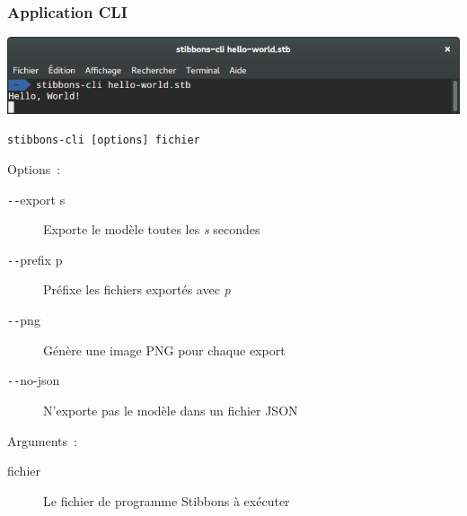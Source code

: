 \begin{frame}[fragile]
\frametitle{Application CLI}
\begin{center}
\includegraphics[scale=0.24]{doc/Presentation/screenshot/stibbons-cli.png}
\end{center}

\verb|stibbons-cli [options] fichier|

Options~:
\begin{description}
	\item[\texttt{-{}-}export s] Exporte le modèle toutes les \emph{s} secondes
	\item[\texttt{-{}-}prefix p] Préfixe les fichiers exportés avec \emph{p}
	\item[\texttt{-{}-}png] Génère une image PNG pour chaque export
	\item[\texttt{-{}-}no-json] N'exporte pas le modèle dans un fichier JSON
\end{description}

Arguments~:
\begin{description}
	\item[fichier] Le fichier de programme Stibbons à exécuter
\end{description}

\end{frame}

